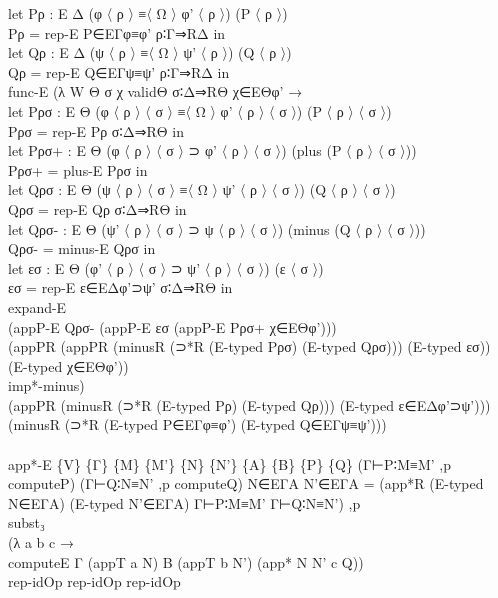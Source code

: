 {\begin{code}
{\>    let Pρ : E Δ (φ 〈 ρ 〉 ≡〈 Ω 〉 φ' 〈 ρ 〉) (P 〈 ρ 〉)\<\\
\>        Pρ = rep-E P∈EΓφ≡φ' ρ∶Γ⇒RΔ in\<\\
\>    let Qρ : E Δ (ψ 〈 ρ 〉 ≡〈 Ω 〉 ψ' 〈 ρ 〉) (Q 〈 ρ 〉)\<\\
\>        Qρ = rep-E Q∈EΓψ≡ψ' ρ∶Γ⇒RΔ in\<\\
\>    func-E (λ W Θ σ χ validΘ σ∶Δ⇒RΘ χ∈EΘφ' → \<\\
\>      let Pρσ : E Θ (φ 〈 ρ 〉 〈 σ 〉 ≡〈 Ω 〉 φ' 〈 ρ 〉 〈 σ 〉) (P 〈 ρ 〉 〈 σ 〉)\<\\
\>          Pρσ = rep-E Pρ σ∶Δ⇒RΘ in\<\\
\>      let Pρσ+ : E Θ (φ 〈 ρ 〉 〈 σ 〉 ⊃ φ' 〈 ρ 〉 〈 σ 〉) (plus (P 〈 ρ 〉 〈 σ 〉))\<\\
\>          Pρσ+ = plus-E Pρσ in\<\\
\>      let Qρσ : E Θ (ψ 〈 ρ 〉 〈 σ 〉 ≡〈 Ω 〉 ψ' 〈 ρ 〉 〈 σ 〉) (Q 〈 ρ 〉 〈 σ 〉)\<\\
\>          Qρσ = rep-E Qρ σ∶Δ⇒RΘ in\<\\
\>      let Qρσ- : E Θ (ψ' 〈 ρ 〉 〈 σ 〉 ⊃ ψ 〈 ρ 〉 〈 σ 〉) (minus (Q 〈 ρ 〉 〈 σ 〉))\<\\
\>          Qρσ- = minus-E Qρσ in\<\\
\>      let εσ : E Θ (φ' 〈 ρ 〉 〈 σ 〉 ⊃ ψ' 〈 ρ 〉 〈 σ 〉) (ε 〈 σ 〉)\<\\
\>          εσ = rep-E ε∈EΔφ'⊃ψ' σ∶Δ⇒RΘ in \<\\
\>      expand-E \<\\
\>        (appP-E Qρσ- (appP-E εσ (appP-E Pρσ+ χ∈EΘφ'))) \<\\
\>          (appPR (appPR (minusR (⊃*R (E-typed Pρσ) (E-typed Qρσ))) (E-typed εσ)) (E-typed χ∈EΘφ')) \<\\
\>        imp*-minus)\<\\
\>    (appPR (minusR (⊃*R (E-typed Pρ) (E-typed Qρ))) (E-typed ε∈EΔφ'⊃ψ'))) \<\\
\>  (minusR (⊃*R (E-typed P∈EΓφ≡φ') (E-typed Q∈EΓψ≡ψ')))\<\\
\>\<\\
\>app*-E \{V\} \{Γ\} \{M\} \{M'\} \{N\} \{N'\} \{A\} \{B\} \{P\} \{Q\} (Γ⊢P∶M≡M' ,p computeP) (Γ⊢Q∶N≡N' ,p computeQ) N∈EΓA N'∈EΓA = (app*R (E-typed N∈EΓA) (E-typed N'∈EΓA) Γ⊢P∶M≡M' Γ⊢Q∶N≡N') ,p \<\\
\>  subst₃\<\\
\>    (λ a b c →\<\\
\>       computeE Γ (appT a N) B (appT b N') (app* N N' c Q))\<\\
\>    rep-idOp rep-idOp rep-idOp \<\\
}
\end{code}}
